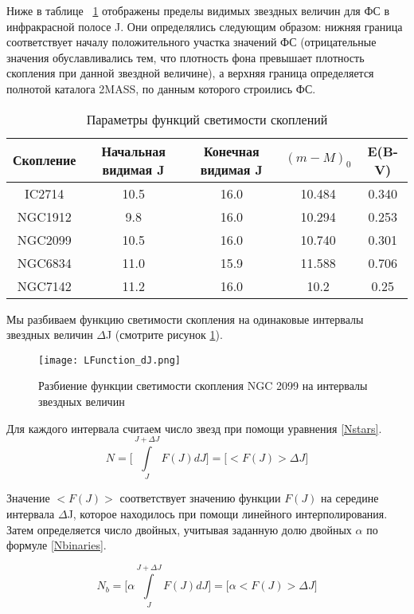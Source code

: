\documentclass[a4paper,12pt]{article}
\begin{document}
Ниже в таблице ~\ref{clusters} отображены пределы видимых звездных величин для ФС в инфракрасной полосе J. Они определялись следующим образом: нижняя граница соответствует началу положительного участка значений ФС (отрицательные значения обуславливались тем, что плотность фона превышает плотность скопления при данной звездной величине), а верхняя граница определяется полнотой каталога 2MASS, по данным которого строились ФС.

\begin{table}[h!]
\caption{Параметры функций светимости скоплений}
\begin{tabular}{|c|c|c|c|c|}
\hline
Скопление & Начальная видимая J& Конечная видимая J& $(m-M)_0$&E(B-V)\\
\hline
IC2714 & 10.5 & 16.0 & 10.484 & 0.340\\
NGC1912 & 9.8 & 16.0 & 10.294 & 0.253\\
NGC2099 & 10.5 & 16.0 & 10.740 & 0.301\\
NGC6834 & 11.0 & 15.9 & 11.588 & 0.706\\
NGC7142 & 11.2 & 16.0 & 10.2 & 0.25\\
\hline
\end{tabular}
\label{clusters}
\end{table}

Мы разбиваем функцию светимости скопления на одинаковые интервалы звездных величин $\Delta $J (смотрите рисунок \ref{LF}). 

\begin{figure}[h!]\centering
\texttt{[image: LFunction\_dJ.png]}
\caption{Разбиение функции светимости скопления NGC 2099 на интервалы звездных величин}
\label{LF}
\end{figure}

Для каждого интервала считаем число звезд при помощи уравнения \eqref{Nstars}.
\begin{equation}
N= \Big[\int\limits_J^{J+\Delta J}{F(J)dJ}\Big] =\Big[<F(J)> \Delta J\Big]  
\label{Nstars}
\end{equation}

Значение $<F(J)>$ соответствует значению функции $F(J)$ на середине интервала $\Delta $J, которое находилось при помощи линейного интерполирования. Затем определяется число двойных, учитывая заданную долю двойных $\alpha$ по формуле \eqref{Nbinaries}. 


\begin{equation}
N_{b}=\Big[\alpha \int\limits_J^{J+\Delta J}{F(J)dJ}\Big]=\Big[\alpha <F(J)> \Delta J\Big]  
\label{Nbinaries}
\end{equation}
\end{document}

